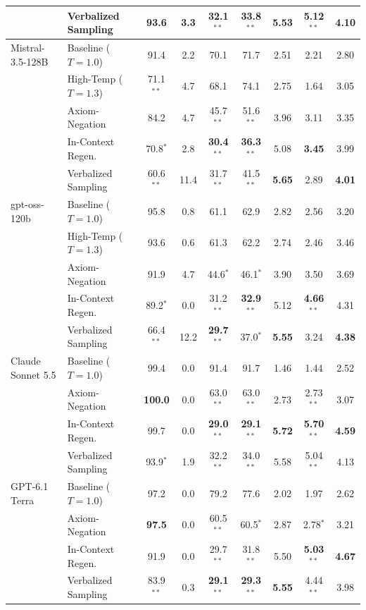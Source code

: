 \documentclass{article}
\begin{document}
\begin{table}[ht]
{\begin{tabular}{llccccccc}
 & Verbalized Sampling & 93.6 & 3.3 & 32.1$^{**}$ & 33.8$^{**}$ & \textbf{5.53} & \textbf{5.12}$^{**}$ & 4.10 \\
\midrule
Mistral-3.5-128B & Baseline ($T=1.0$) & 91.4 & 2.2 & 70.1 & 71.7 & 2.51 & 2.21 & 2.80 \\
 & High-Temp ($T=1.3$) & 71.1$^{**}$ & 4.7 & 68.1 & 74.1 & 2.75 & 1.64 & 3.05 \\
 & Axiom-Negation & 84.2 & 4.7 & 45.7$^{**}$ & 51.6$^{**}$ & 3.96 & 3.11 & 3.35 \\
 & In-Context Regen. & 70.8$^*$ & 2.8 & \textbf{30.4}$^{**}$ & \textbf{36.3}$^{**}$ & 5.08 & \textbf{3.45} & 3.99 \\
 & Verbalized Sampling & 60.6$^{**}$ & 11.4 & 31.7$^{**}$ & 41.5$^{**}$ & \textbf{5.65} & 2.89 & \textbf{4.01} \\
\midrule
gpt-oss-120b & Baseline ($T=1.0$) & 95.8 & 0.8 & 61.1 & 62.9 & 2.82 & 2.56 & 3.20 \\
 & High-Temp ($T=1.3$) & 93.6 & 0.6 & 61.3 & 62.2 & 2.74 & 2.46 & 3.46 \\
 & Axiom-Negation & 91.9 & 4.7 & 44.6$^*$ & 46.1$^*$ & 3.90 & 3.50 & 3.69 \\
 & In-Context Regen. & 89.2$^*$ & 0.0 & 31.2$^{**}$ & \textbf{32.9}$^{**}$ & 5.12 & \textbf{4.66}$^{**}$ & 4.31 \\
 & Verbalized Sampling & 66.4$^{**}$ & 12.2 & \textbf{29.7}$^{**}$ & 37.0$^*$ & \textbf{5.55} & 3.24 & \textbf{4.38} \\
\midrule
Claude Sonnet 5.5 & Baseline ($T=1.0$) & 99.4 & 0.0 & 91.4 & 91.7 & 1.46 & 1.44 & 2.52 \\
 & Axiom-Negation & \textbf{100.0} & 0.0 & 63.0$^{**}$ & 63.0$^{**}$ & 2.73 & 2.73$^{**}$ & 3.07 \\
 & In-Context Regen. & 99.7 & 0.0 & \textbf{29.0}$^{**}$ & \textbf{29.1}$^{**}$ & \textbf{5.72} & \textbf{5.70}$^{**}$ & \textbf{4.59} \\
 & Verbalized Sampling & 93.9$^*$ & 1.9 & 32.2$^{**}$ & 34.0$^{**}$ & 5.58 & 5.04$^{**}$ & 4.13 \\
\midrule
GPT-6.1 Terra & Baseline ($T=1.0$) & 97.2 & 0.0 & 79.2 & 77.6 & 2.02 & 1.97 & 2.62 \\
 & Axiom-Negation & \textbf{97.5} & 0.0 & 60.5$^{**}$ & 60.5$^*$ & 2.87 & 2.78$^*$ & 3.21 \\
 & In-Context Regen. & 91.9 & 0.0 & 29.7$^{**}$ & 31.8$^{**}$ & 5.50 & \textbf{5.03}$^{**}$ & \textbf{4.67} \\
 & Verbalized Sampling & 83.9$^{**}$ & 0.3 & \textbf{29.1}$^{**}$ & \textbf{29.3}$^{**}$ & \textbf{5.55} & 4.44$^{**}$ & 3.98 \\
\bottomrule
\end{tabular}}
\end{table}
\end{document}
